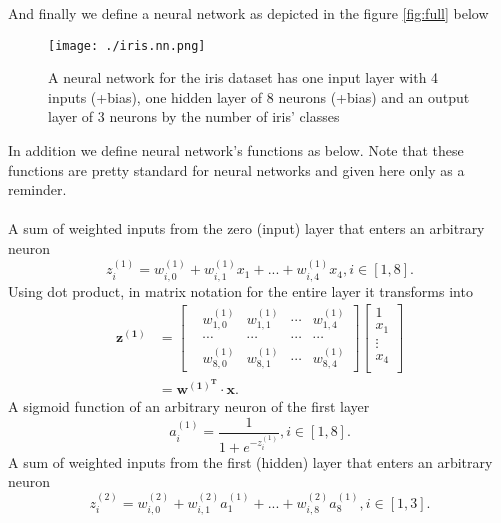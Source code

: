 \documentclass[a4paper,12pt,notitlepage]{article}
\begin{document}
And finally we define a neural network as depicted in the figure \eqref{fig:full} below
\begin{figure}[H]
    \centering
    \texttt{[image: ./iris.nn.png]}
    \caption{A neural network for the iris dataset has one input layer with 4 inputs (+bias), one hidden layer of 8 neurons (+bias) and an output layer of 3 neurons by the number of iris' classes}
    \label{fig:full}
\end{figure}
In addition we define neural network's functions as below. Note that these functions are pretty standard for neural networks and given here only as a reminder.\\\\
A sum of weighted inputs from the zero (input) layer that enters an arbitrary neuron
	\begin{equation*} z_{i}^{(1)}=w_{i,0}^{(1)}+w_{i,1}^{(1)}x_{1}+...+w_{i,4}^{(1)}x_{4}, i \in [1,8].\end{equation*} 
Using dot product, in matrix notation for the entire layer it transforms into  
      \begin{equation*}
       \begin{split} 
           \mathbf{z^{(1)}}&=\begin{bmatrix}
           &w_{1,0}^{(1)} &w_{1,1}^{(1)} &\cdots &w_{1,4}^{(1)} \\ 
           &\cdots &\cdots &\cdots &\cdots\\ 
           &w_{8,0}^{(1)} &w_{8,1}^{(1)} &\cdots &w_{8,4}^{(1)} 
       \end{bmatrix}
       \begin{bmatrix}
          1\\ 
          x_{1}\\ 
          \vdots \\ 
          x_{4}\\ 
       \end{bmatrix} \\
       &=\mathbf{w^{(1)^{T}}}\cdot \mathbf{x}.
       \end{split}
       \end{equation*}
A sigmoid function of an arbitrary neuron of the first layer
    \begin{equation*} a_{i}^{(1)}=\frac{1}{1+e^{-z_{i}^{(1)}}}, i \in [1,8]. \end{equation*}
A sum of weighted inputs from the first (hidden) layer that enters an arbitrary neuron
    \begin{equation*} z_{i}^{(2)}=w_{i,0}^{(2)}+w_{i,1}^{(2)}a_{1}^{(1)}+...+w_{i,8}^{(2)}a_{8}^{(1)}, i \in [1,3]. \end{equation*}
\end{document}
